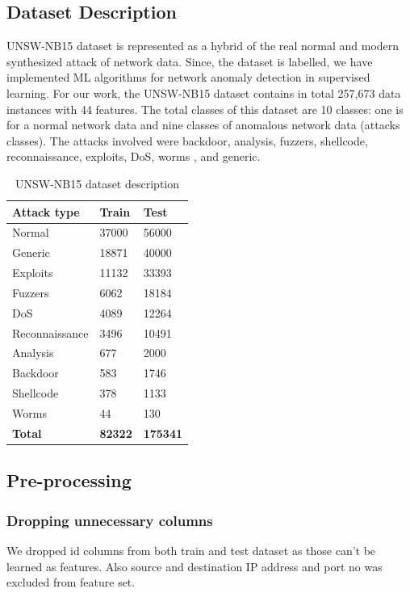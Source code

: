 \documentclass[14pt, conference]{IEEEtran}
\begin{document}
\subsection{Dataset Description}
UNSW-NB15 dataset is represented as a hybrid of the real normal and modern synthesized attack of
network data. Since, the dataset is labelled, we have implemented ML algorithms for network anomaly
detection in supervised learning. For our work, the UNSW-NB15 dataset contains in total 257,673 data instances with 44 features. The total classes of this dataset are 10 classes: one
is for a normal network data and nine classes of anomalous network data (attacks
classes). The attacks involved were backdoor, analysis, fuzzers, shellcode, reconnaissance, exploits, DoS, worms , and generic. 
\begin{table}[ht]
\normalsize

\centering
\caption{UNSW-NB15 dataset description}
\label{unsw_nb15_des}
\renewcommand{\arraystretch}{1.2}

\begin{tabular}{|C{3cm}|C{1.6cm}|C{1.6cm}|}
\hline
\textbf{Attack type} & \textbf{Train} & \textbf{Test} \\ \hline
Normal & 37000 & 56000  \\ \hline
Generic  &         18871 & 40000 \\ \hline
Exploits  &        11132 & 33393 \\ \hline
Fuzzers    &        6062 & 18184 \\ \hline
DoS         &       4089 & 12264 \\ \hline
Reconnaissance &    3496 &  10491 \\ \hline
Analysis    &        677 &  2000 \\ \hline
Backdoor     &       583 & 1746 \\ \hline
Shellcode     &      378 & 1133 \\ \hline
Worms         &       44 &  130 \\ \hline
\textbf{Total} & \textbf{82322}  & \textbf{175341} \\ \hline
\end{tabular}
\end{table}


\subsection{Pre-processing}
\subsubsection{Dropping unnecessary columns}
We dropped id columns from both train and test dataset as those can't be learned as features. Also source and destination IP address and port no was excluded from feature set.
\end{document}
